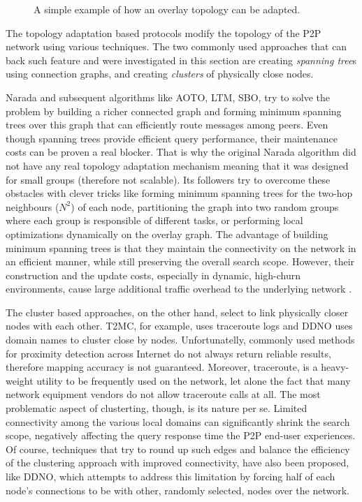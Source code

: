 \begin{figure}[ht]
{  \label{figure:topology-adaptation:after}
}
\caption{A simple example of how an overlay topology can be adapted.}
\label{figure:topology-adaptation}
\end{figure}

The topology adaptation based protocols modify the topology of the P2P network
using various techniques. The two commonly used approaches that can
back such feature and were investigated in this section are creating
\emph{spanning tree}s using connection graphs, and creating \emph{clusters} of
physically close nodes.

Narada and subsequent algorithms like AOTO, LTM, SBO, try to solve the problem
by building a richer connected graph and forming minimum spanning trees over
this graph that can efficiently route messages among peers. Even though spanning
trees provide efficient query performance, their maintenance costs can be
proven a real blocker. That is why the original Narada algorithm did not have
any real topology adaptation mechanism meaning that it was designed for small
groups (therefore not scalable). Its followers try to overcome these obstacles
with clever tricks like forming minimum spanning trees for the two-hop
neighbours ($N^2$) of each node, partitioning the graph into two random groups
where each group is responsible of different tasks, or performing local
optimizations dynamically on the overlay graph. The advantage of building
minimum spanning trees is that they maintain the connectivity on the network in
an efficient manner, while still preserving the overall search scope. However,
their construction and the update costs, especially in dynamic, high-churn
environments, cause large additional traffic overhead to the underlying
network \cite{CRZ2000,CRSZ2001,CRSZ2002}.

The cluster based approaches, on the other hand, select to link physically
closer nodes with each other. T2MC, for example, uses traceroute logs and DDNO
uses domain names to cluster close by nodes. Unfortunatelly, commonly used
methods for proximity detection across Internet do not always return
reliable results, therefore mapping accuracy is not guaranteed. Moreover,
traceroute, is a heavy-weight utility to be frequently used on the
network, let alone the fact that many network equipment vendors do not allow
traceroute calls at all. The most problematic aspect of clusterting, though, is
its nature per se. Limited connectivity among the various local domains can
significantly shrink the search scope, negatively affecting the query response
time the P2P end-user experiences. Of course, techniques that try to round up
such edges and balance the efficiency of the clustering approach with improved
connectivity, have also been proposed, like DDNO, which attempts to address this
limitation by forcing half of each node's connections to be with other, randomly
selected, nodes over the network.

